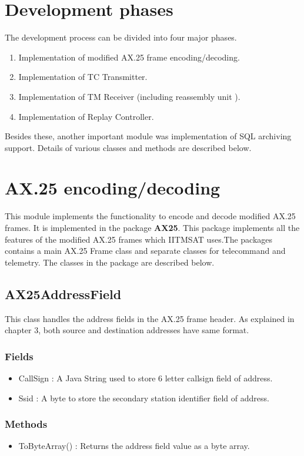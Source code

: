 \documentclass[BTech]{iitmdiss}
\begin{document}
\section{Development phases}
The development process can be divided into four major phases.
\begin{enumerate}
\item Implementation of modified AX.25 frame encoding/decoding.
\item Implementation of TC Transmitter.
\item Implementation of TM Receiver (including reassembly unit ).
\item Implementation of Replay Controller.
\end{enumerate}
Besides these, another important module was implementation of SQL archiving support. Details of various classes and methods are described below. 
\section{AX.25 encoding/decoding}
This module implements the functionality to encode and decode modified AX.25 frames. It is implemented in the package \textbf{AX25}. This package implements all the features of the modified AX.25 frames which IITMSAT uses.The packages contains a main AX.25 Frame class and separate classes for telecommand and telemetry. The classes in the package are described below.

\subsection{AX25AddressField}
This class handles the address fields in the AX.25 frame header. As explained in chapter 3, both source and destination addresses have same format. 
\subsubsection{Fields}
\begin{itemize}
\item CallSign : A Java String used to store 6 letter callsign field of address.
\item Ssid : A byte to store the secondary station identifier field of address. 
\end{itemize}

\subsubsection{Methods}
\begin{itemize}
\item ToByteArray() : Returns the address field value as a byte array. 
\end{itemize}
\end{document}

